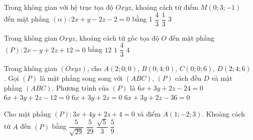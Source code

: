 \begin{ex}%
	Trong không gian với hệ trục tọa độ $Oxyz$, khoảng cách từ điểm $M(0;3;-1)$  đến mặt phẳng $(\alpha)\colon 2x+y-2z-2=0$ bằng
	\choice 
		{\True $1$} 
		{$\dfrac{4}{3}$} 
		 {$\dfrac{1}{3}$}
		{$3$} 
\end{ex}

\begin{ex}%
	Trong không gian $Oxyz$, khoảng cách từ gốc tọa  độ $O$ đến mặt phẳng $(P)\colon 2x-y+2z+12=0$ bằng
	 \choice
		{$12$} 
		 {$1$}
		 {$\dfrac{4}{3}$}
		 {\True $4$}
\end{ex}

\begin{ex}%
	Trong không gian $(Oxyz)$, cho $A(2;0;0)$, $B(0;4;0)$, $C(0;0;6)$, $D(2;4;6)$. Gọi $(P)$ là mặt phẳng song song với  $(ABC)$, $(P)$ cách đều $D$ và mặt phẳng $(ABC)$. Phương trình của $(P)$ là
	 \choice
		 {\True $6x+3y+2z-24=0$}
		{$6x+3y+2z-12=0$} 
		{$6x+3y+2z=0$} 
		{$6x+3y+2z-36=0$} 
\end{ex}

\begin{ex}%
	Cho mặt phẳng $(P)\colon 3 x+4 y+2  z+4=0$ và điểm $A(1;-2; 3)$. Khoảng cách từ $A$ đến $(P)$ bằng
	 \choice
		{\True $\dfrac{5}{\sqrt{29}}$} 
		 {$\dfrac{5}{29}$}
		 {$\dfrac{\sqrt{5}}{3}$}
		{$\dfrac{5}{9}$} 
\end{ex}

